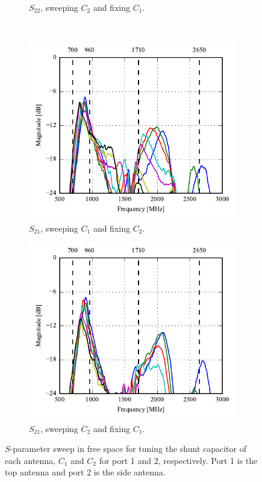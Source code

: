 \begin{figure}[htbp]
\begin{subfigure}[b]{0.49\linewidth}
        \caption{$S_{22}$, sweeping $C_2$ and fixing $C_1$.}
    \end{subfigure}
~
    \begin{subfigure}[b]{0.49\linewidth}
        \centering
        \includegraphics{img/tech_sol/monopole/prototype_v2/meas_s12_csh1}
        \caption{$S_{21}$, sweeping $C_1$ and fixing $C_2$.}
    \end{subfigure}
    \hfill
    \begin{subfigure}[b]{0.49\linewidth}
        \centering
        \includegraphics{img/tech_sol/monopole/prototype_v2/meas_s21_csh1}
        \caption{$S_{21}$, sweeping $C_2$ and fixing $C_1$.}
    \end{subfigure}
    \caption{$S$-parameter sweep in free space for tuning the shunt capacitor of each antenna, $C_1$ and $C_2$ for port 1 and 2, respectively. Port 1 is the top antenna and port 2 is the side antenna.}
    \label{fig:sparam_mono_proto_sim_meas}
\end{figure}

